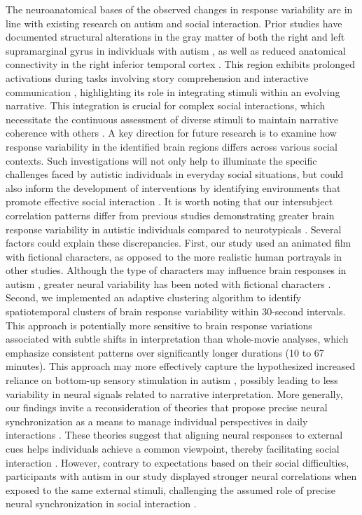 The neuroanatomical bases of the observed changes in response variability are in line with existing research on autism and social interaction. Prior studies have documented structural alterations in the gray matter of both the right and left supramarginal gyrus in individuals with autism \citep{brieber2007,ke2008,libero2014}, as well as reduced anatomical connectivity in the right inferior temporal cortex \citep{boets2018,koldewyn2014}. This region exhibits prolonged activations during tasks involving story comprehension and interactive communication \citep{youssofzadeh2022,stolk2013}, highlighting its role in integrating stimuli within an evolving narrative. This integration is crucial for complex social interactions, which necessitate the continuous assessment of diverse stimuli to maintain narrative coherence with others \citep{goffman1974,johnson2023,stolk2022}. A key direction for future research is to examine how response variability in the identified brain regions differs across various social contexts. Such investigations will not only help to illuminate the specific challenges faced by autistic individuals in everyday social situations, but could also inform the development of interventions by identifying environments that promote effective social interaction \citep{wadge2019}.
It is worth noting that our intersubject correlation patterns differ from previous studies demonstrating greater brain response variability in autistic individuals compared to neurotypicals \citep{byrge2015,hahamy2015,hasson2009,lyons2020,nunes2019,ou2022,pegado2020,salmi2013}. Several factors could explain these discrepancies. First, our study used an animated film with fictional characters, as opposed to the more realistic human portrayals in other studies. Although the type of characters may influence brain responses in autism \citep{atherton2018}, greater neural variability has been noted with fictional characters \citep{lyons2020}. Second, we implemented an adaptive clustering algorithm to identify spatiotemporal clusters of brain response variability within 30-second intervals. This approach is potentially more sensitive to brain response variations associated with subtle shifts in interpretation than whole-movie analyses, which emphasize consistent patterns over significantly longer durations (10 to 67 minutes). This approach may more effectively capture the hypothesized increased reliance on bottom-up sensory stimulation in autism \citep{pellicano2012}, possibly leading to less variability in neural signals related to narrative interpretation. More generally, our findings invite a reconsideration of theories that propose precise neural synchronization as a means to manage individual perspectives in daily interactions \citep{holroyd2022}. These theories suggest that aligning neural responses to external cues helps individuals achieve a common viewpoint, thereby facilitating social interaction \citep{hasson2012,mayo2021}. However, contrary to expectations based on their social difficulties, participants with autism in our study displayed stronger neural correlations when exposed to the same external stimuli, challenging the assumed role of precise neural synchronization in social interaction \citep{stolk2014}.
